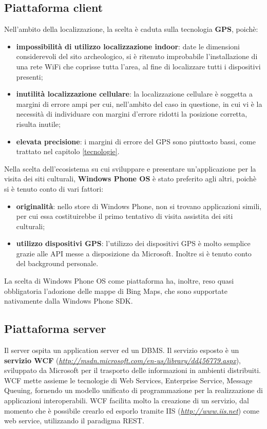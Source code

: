 \subsection{Piattaforma client}
Nell'ambito della localizzazione, la scelta è caduta sulla tecnologia \textbf{GPS}, poichè:
\begin{itemize}
\item \textbf{impossibilità di utilizzo localizzazione indoor}: date le dimensioni considerevoli del sito archeologico, si è ritenuto improbabile l'installazione di una rete WiFi che coprisse tutta l'area, al fine di localizzare tutti i dispositivi presenti;
\item \textbf{inutilità localizzazione cellulare}: la localizzazione cellulare è soggetta a margini di errore ampi per cui, nell'ambito del caso in questione, in cui vi è la necessità di individuare con margini d'errore ridotti la posizione corretta, risulta inutile;
\item \textbf{elevata precisione}: i margini di errore del GPS sono piuttosto bassi, come trattato nel capitolo \ref{tecnologie}.
\end{itemize}


Nella scelta dell'ecosistema su cui sviluppare e presentare un'applicazione per la visita dei siti culturali, \textbf{Windows Phone OS} è stato preferito agli altri, poichè si è tenuto conto di vari fattori:
\begin{itemize}
\item \textbf{originalità}: nello store di Windows Phone, non si trovano applicazioni simili, per cui essa costituirebbe il primo tentativo di visita assistita dei siti culturali;
\item \textbf{utilizzo dispositivi GPS}: l'utilizzo dei dispositivi GPS è molto semplice grazie alle API messe a disposizione da Microsoft. Inoltre si è tenuto conto del background personale.
\end{itemize}

La scelta di Windows Phone OS come piattaforma ha, inoltre, reso quasi obbligatoria l'adozione delle mappe di Bing Maps, che sono supportate nativamente dalla Windows Phone SDK.

\subsection{Piattaforma server}
Il server ospita un application server ed un DBMS.
Il servizio esposto è un \textbf{servizio WCF} (\emph{\url{http://msdn.microsoft.com/en-us/library/dd456779.aspx}}), sviluppato da Microsoft per il trasporto delle informazioni in ambienti distribuiti.
WCF mette assieme le tecnologie di Web Services, Enterprise Service, Message Queuing, fornendo un modello unificato di programmazione per la realizzazione di applicazioni interoperabili.
WCF facilita molto la creazione di un servizio, dal momento che è possibile crearlo ed esporlo tramite IIS (\emph{\url{http://www.iis.net}}) come web service, utilizzando il paradigma REST.

